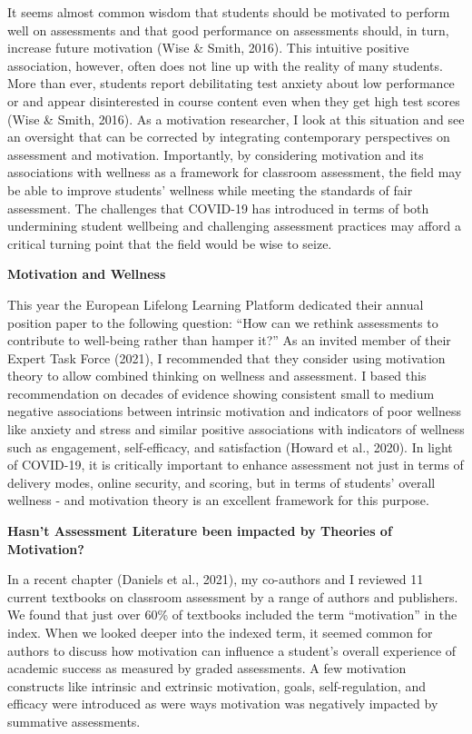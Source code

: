 \documentclass[
]{book}
\begin{document}
It seems almost common wisdom that students should be motivated to perform well on assessments and that good performance on assessments should, in turn, increase future motivation (Wise \& Smith, 2016). This intuitive positive association, however, often does not line up with the reality of many students. More than ever, students report debilitating test anxiety about low performance or and appear disinterested in course content even when they get high test scores (Wise \& Smith, 2016). As a motivation researcher, I look at this situation and see an oversight that can be corrected by integrating contemporary perspectives on assessment and motivation. Importantly, by considering motivation and its associations with wellness as a framework for classroom assessment, the field may be able to improve students' wellness while meeting the standards of fair assessment. The challenges that COVID-19 has introduced in terms of both undermining student wellbeing and challenging assessment practices may afford a critical turning point that the field would be wise to seize.

\textbf{Motivation and Wellness}

This year the European Lifelong Learning Platform dedicated their annual position paper to the following question: ``How can we rethink assessments to contribute to well-being rather than hamper it?'' As an invited member of their Expert Task Force (2021), I recommended that they consider using motivation theory to allow combined thinking on wellness and assessment. I based this recommendation on decades of evidence showing consistent small to medium negative associations between intrinsic motivation and indicators of poor wellness like anxiety and stress and similar positive associations with indicators of wellness such as engagement, self-efficacy, and satisfaction (Howard et al., 2020). In light of COVID-19, it is critically important to enhance assessment not just in terms of delivery modes, online security, and scoring, but in terms of students' overall wellness - and motivation theory is an excellent framework for this purpose.

\textbf{Hasn't Assessment Literature been impacted by Theories of Motivation?}

In a recent chapter (Daniels et al., 2021), my co-authors and I reviewed 11 current textbooks on classroom assessment by a range of authors and publishers. We found that just over 60\% of textbooks included the term ``motivation'' in the index. When we looked deeper into the indexed term, it seemed common for authors to discuss how motivation can influence a student's overall experience of academic success as measured by graded assessments. A few motivation constructs like intrinsic and extrinsic motivation, goals, self-regulation, and efficacy were introduced as were ways motivation was negatively impacted by summative assessments.
\end{document}
